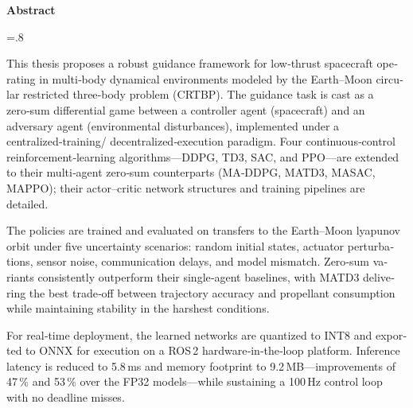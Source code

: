


\pagestyle{empty}

\begin{latin}
	
	\begin{center}
		\textbf{Abstract}
	\end{center}
	\baselineskip=.8\baselineskip
	\noindent
	
This thesis proposes a robust guidance framework for low‑thrust spacecraft operating in multi‑body dynamical environments modeled by the Earth–Moon circular restricted three‑body problem (CRTBP). The guidance task is cast as a zero‑sum differential game between a controller agent (spacecraft) and an adversary agent (environmental disturbances), implemented under a centralized‑training/ decentralized‑execution paradigm. Four continuous‑control reinforcement‑learning algorithms—DDPG, TD3, SAC, and PPO—are extended to their multi‑agent zero‑sum counterparts (MA‑DDPG, MATD3, MASAC, MAPPO); their actor–critic network structures and training pipelines are detailed.

The policies are trained and evaluated on transfers to the Earth–Moon  lyapunov orbit under five uncertainty scenarios: random initial states, actuator perturbations, sensor noise, communication delays, and model mismatch. Zero‑sum variants consistently outperform their single‑agent baselines, with MATD3 delivering the best trade‑off between trajectory accuracy and propellant consumption while maintaining stability in the harshest conditions.

For real‑time deployment, the learned networks are quantized to INT8 and exported to ONNX for execution on a ROS 2 hardware‑in‑the‑loop platform. Inference latency is reduced to 5.8 ms and memory footprint to 9.2 MB—improvements of 47 \% and 53 \% over the FP32 models—while sustaining a 100 Hz control loop with no deadline misses.


\end{latin}
